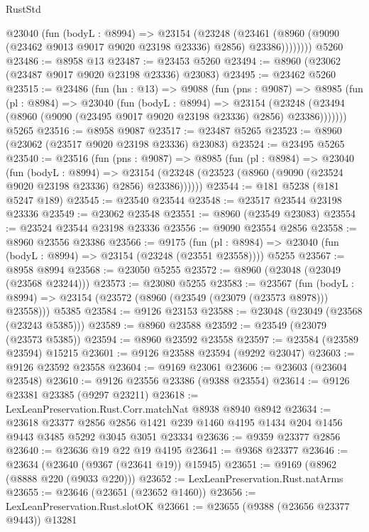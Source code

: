 \begin{lexlean}{RustStd}
\begin{coremodule}
          @23040
            (fun (bodyL : @8994) =>
            @23154
              (@23248
                (@23461 (@8960 (@9090 (@23462 @9013 @9017 @9020 @23198 @23336) @2856) @23386))))))))
    @5260
@23486 := @8958 @13
@23487 := @23453 @5260
@23494 := @8960 (@23062 (@23487 @9017 @9020 @23198 @23336) @23083)
@23495 := @23462 @5260
@23515 := @23486
    (fun (hn : @13) =>
    @9088
      (fun (pns : @9087) =>
      @8985
        (fun (pl : @8984) =>
        @23040
          (fun (bodyL : @8994) =>
          @23154
            (@23248 (@23494 (@8960 (@9090 (@23495 @9017 @9020 @23198 @23336) @2856) @23386)))))))
    @5265
@23516 := @8958 @9087
@23517 := @23487 @5265
@23523 := @8960 (@23062 (@23517 @9020 @23198 @23336) @23083)
@23524 := @23495 @5265
@23540 := @23516
    (fun (pns : @9087) =>
    @8985
      (fun (pl : @8984) =>
      @23040
        (fun (bodyL : @8994) =>
        @23154 (@23248 (@23523 (@8960 (@9090 (@23524 @9020 @23198 @23336) @2856) @23386))))))
@23544 := @181 @5238 (@181 @5247 @189)
@23545 := @23540 @23544
@23548 := @23517 @23544 @23198 @23336
@23549 := @23062 @23548
@23551 := @8960 (@23549 @23083)
@23554 := @23524 @23544 @23198 @23336
@23556 := @9090 @23554 @2856
@23558 := @8960 @23556 @23386
@23566 := @9175
    (fun (pl : @8984) => @23040 (fun (bodyL : @8994) => @23154 (@23248 (@23551 @23558))))
    @5255
@23567 := @8958 @8994
@23568 := @23050 @5255
@23572 := @8960 (@23048 (@23049 (@23568 @23244)))
@23573 := @23080 @5255
@23583 := @23567
    (fun (bodyL : @8994) => @23154 (@23572 (@8960 (@23549 (@23079 (@23573 @8978))) @23558)))
    @5385
@23584 := @9126 @23153
@23588 := @23048 (@23049 (@23568 (@23243 @5385)))
@23589 := @8960 @23588
@23592 := @23549 (@23079 (@23573 @5385))
@23594 := @8960 @23592 @23558
@23597 := @23584 (@23589 @23594) @15215
@23601 := @9126 @23588 @23594 (@9292 @23047)
@23603 := @9126 @23592 @23558
@23604 := @9169 @23061
@23606 := @23603 (@23604 @23548)
@23610 := @9126 @23556 @23386 (@9388 @23554)
@23614 := @9126 @23381 @23385 (@9297 @23211)
@23618 := LexLeanPreservation.Rust.Corr.matchNat @8938 @8940 @8942
@23634 := @23618
    @23377
    @2856
    @2856
    @1421
    @239
    @1460
    @4195
    @1434
    @204
    @1456
    @9443
    @3485
    @5292
    @3045
    @3051
    @23334
@23636 := @9359 @23377 @2856
@23640 := @23636 @19 @22 @19 @4195
@23641 := @9368 @23377
@23646 := @23634 (@23640 (@9367 (@23641 @19)) @15945)
@23651 := @9169 (@8962 (@8888 @220 (@9033 @220)))
@23652 := LexLeanPreservation.Rust.natArms
@23655 := @23646 (@23651 (@23652 @1460))
@23656 := LexLeanPreservation.Rust.slotOK
@23661 := @23655 (@9388 (@23656 @23377 @9443)) @13281

\end{coremodule}
\end{lexlean}
